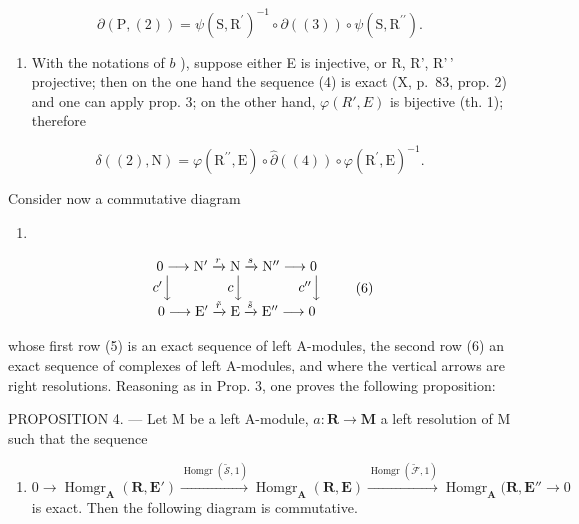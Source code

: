 \[
\partial (\mathrm{P}, (2)) = \psi (\mathrm{S}, \mathrm{R} ^ {\prime}) ^ {- 1} \circ \partial ((3)) \circ \psi (\mathrm{S}, \mathrm{R} ^ {\prime \prime}).
\]

\begin{enumerate}
\def\labelenumi{\arabic{enumi})}
\setcounter{enumi}{2}
\tightlist
\item
  With the notations of \(b\) ), suppose either E is injective, or R, R', R'\,' projective; then on the one hand the sequence (4) is exact (X, p.~83, prop. 2) and one can apply prop. 3; on the other hand, \(\varphi(R', E)\) is bijective (th. 1); therefore
\end{enumerate}

\[
\delta ((2), \mathrm{N}) = \varphi (\mathrm{R} ^ {\prime \prime}, \mathrm{E}) \circ \hat {\partial} ((4)) \circ \varphi (\mathrm{R} ^ {\prime}, \mathrm{E}) ^ {- 1}.
\]

Consider now a commutative diagram

\begin{enumerate}
\def\labelenumi{(\arabic{enumi})}
\setcounter{enumi}{4}
\tightlist
\item
\end{enumerate}

\[
\begin{array}{c} 0 \longrightarrow \mathrm{N} ^ {\prime} \xrightarrow {r} \mathrm{N} \xrightarrow {s} \mathrm{N} ^ {\prime \prime} \longrightarrow 0 \\ c ^ {\prime} \Big \downarrow \qquad \qquad c \Big \downarrow \qquad \qquad c ^ {\prime \prime} \Big \downarrow \\ 0 \longrightarrow \mathrm{E} ^ {\prime} \xrightarrow {\tilde {r}} \mathrm{E} \xrightarrow {\tilde {s}} \mathrm{E} ^ {\prime \prime} \longrightarrow 0 \end{array}\tag{6}
\]

whose first row (5) is an exact sequence of left A-modules, the second row (6) an exact sequence of complexes of left A-modules, and where the vertical arrows are right resolutions. Reasoning as in Prop. 3, one proves the following proposition:

PROPOSITION 4. --- Let M be a left A-module, \(a: \mathbf{R} \to \mathbf{M}\) a left resolution of M such that the sequence

\begin{enumerate}
\def\labelenumi{(\arabic{enumi})}
\setcounter{enumi}{6}
\tightlist
\item
  \(0 \to \operatorname{Homgr}_{\mathbf{A}}(\mathbf{R}, \mathbf{E}') \xrightarrow{\operatorname{Homgr}(\tilde{\mathcal{S}}, 1)} \operatorname{Homgr}_{\mathbf{A}}(\mathbf{R}, \mathbf{E}) \xrightarrow{\operatorname{Homgr}(\tilde{\mathcal{F}}, 1)} \operatorname{Homgr}_{\mathbf{A}}(\mathbf{R}, \mathbf{E}'' \to 0\) is exact. Then the following diagram is commutative.
\end{enumerate}

